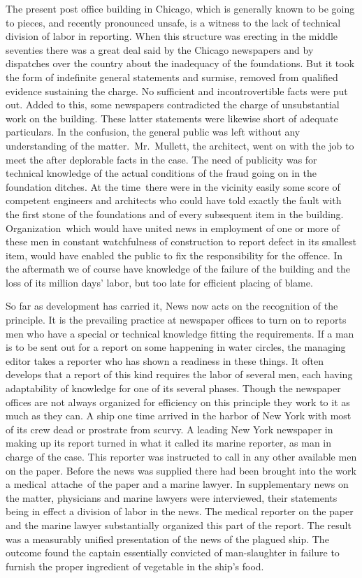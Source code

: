 \documentclass[twoside,symmetric,nobib,justified]{tufte-book}
\begin{document}
\newpage The present post office building in Chicago, which is generally known to
be going to pieces, and recently pronounced unsafe, is a witness to the
lack of technical division of labor in reporting. When this structure
was erecting in the middle seventies there was a great deal said by the
Chicago newspapers and by dispatches over the country about the
inadequacy of the foundations. But it took the form of indefinite
general statements and surmise, removed from qualified evidence
sustaining the charge. No sufficient and incontrovertible facts were put
out. Added to this, some newspapers contradicted the charge of
unsubstantial work on the building. These latter statements were
likewise short of adequate particulars. In the confusion, the general
public was left without any understanding of the matter.~Mr.~Mullett,
the architect, went on with the job to meet the after deplorable facts
in the case. The need of publicity was for technical knowledge of the
actual conditions of the fraud going on in the foundation ditches. At
the time~there were in the vicinity easily some score of competent
engineers and architects who could have told exactly the fault with the
first stone of the foundations and of every subsequent item in the
building. Organization~which would have united news in employment of one
or more of these men in constant watchfulness of construction to report
defect in its smallest item, would have enabled the public to fix the
responsibility for the offence. In the aftermath we of course have
knowledge of the failure of the building and the loss of its million
days' labor, but too late for efficient placing of blame. ~

So far as development has carried it, News now acts on the recognition
of the principle. It is the prevailing practice at newspaper offices to
turn on to reports men who have a special or technical knowledge fitting
the requirements. If a man is to be sent out for a report on some
happening in water circles, the managing editor takes a reporter who has
shown a readiness in these things. It often develops that a report of
this kind requires the labor of several men, each having adaptability of
knowledge for one of its several phases. Though the newspaper offices
are not always organized for efficiency on this principle they work to
it as much as they can. A ship one time arrived in the harbor of New
York with most of its crew dead or prostrate from scurvy. A leading New
York newspaper in making up its report turned in what it called its
marine reporter, as man in charge of the case. This reporter was
instructed to call in any other available men on the paper. Before the
news was supplied there had been brought into the work a
medical~attache~of the paper and a marine lawyer. In supplementary news
on the matter, physicians and marine lawyers were interviewed, their
statements being in effect a division of labor in the news. The medical
reporter on the paper and the marine lawyer substantially organized this
part of the report. The result was a measurably unified presentation of
the news of the plagued ship. The outcome found the captain essentially
convicted of man-slaughter in failure to furnish the proper ingredient
of vegetable in the ship's food.~
\end{document}
